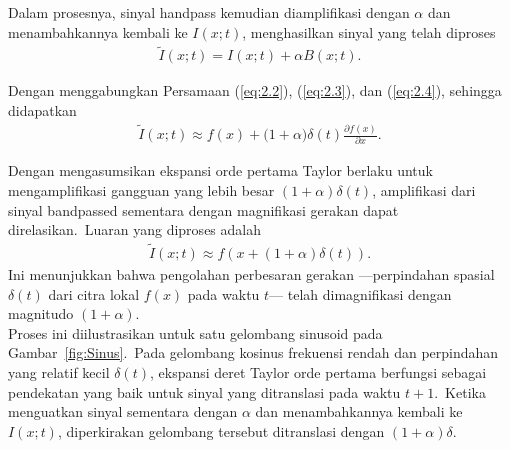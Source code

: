 Dalam prosesnya, sinyal handpass kemudian diamplifikasi dengan \(\alpha \) dan menambahkannya kembali ke \(I(x; t)\), menghasilkan sinyal yang telah diproses
\begin{equation} \label{eq:2.4}
\begin{aligned}
{\tilde I(x; t)  =  I(x; t)  +  }\alpha {B(x; t)}.
\end{aligned}
\end{equation}


Dengan menggabungkan Persamaan (\ref{eq:2.2}), (\ref{eq:2.3}), dan (\ref{eq:2.4}), sehingga didapatkan 
\begin{equation} \label{eq:2.5}
\begin{aligned}
\tilde I(x; t) \approx {f(x)  +  (1 + }\alpha)\delta {(t)}\frac{{\partial f(x)}}{{\partial x}}.
\end{aligned}
\end{equation}

Dengan mengasumsikan ekspansi orde pertama Taylor berlaku untuk mengamplifikasi gangguan yang lebih besar \((1 +\alpha)\delta{(t)}\), amplifikasi dari sinyal bandpassed sementara dengan magnifikasi gerakan dapat direlasikan.~Luaran yang diproses adalah
\begin{equation} \label{eq:2.6}
\begin{aligned}
\tilde I(x; t) \approx f(x  +  (1  + \alpha )\delta (t)).
\end{aligned}
\end{equation}
Ini menunjukkan bahwa pengolahan perbesaran gerakan ---perpindahan spasial  \(\delta (t)\) dari citra lokal \(f(x)\) pada waktu \(t\)--- telah dimagnifikasi dengan magnitudo \((1+\alpha)\).\\

Proses ini diilustrasikan untuk satu gelombang sinusoid pada Gambar~\ref{fig:Sinus}.~Pada gelombang kosinus frekuensi rendah dan perpindahan yang relatif kecil \(\delta (t)\), ekspansi deret Taylor orde pertama berfungsi sebagai pendekatan yang baik untuk sinyal yang ditranslasi pada waktu \(t+1\).~Ketika menguatkan sinyal sementara dengan \(\alpha\) dan menambahkannya kembali ke \(I(x; t)\), diperkirakan gelombang tersebut ditranslasi dengan \((1  + \alpha )\delta\).

